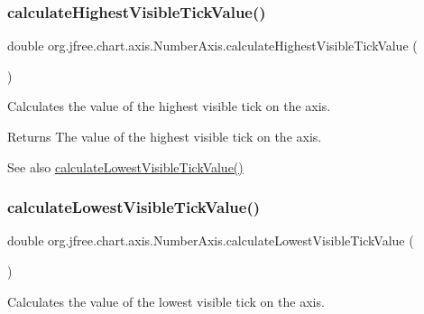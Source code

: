 \subsubsection{\texorpdfstring{calculate\+Highest\+Visible\+Tick\+Value()}{calculateHighestVisibleTickValue()}}
{\footnotesize\ttfamily double org.\+jfree.\+chart.\+axis.\+Number\+Axis.\+calculate\+Highest\+Visible\+Tick\+Value (\begin{DoxyParamCaption}{ }\end{DoxyParamCaption})\hspace{0.3cm}{\ttfamily [protected]}}

Calculates the value of the highest visible tick on the axis.

\begin{DoxyReturn}{Returns}
The value of the highest visible tick on the axis.
\end{DoxyReturn}
\begin{DoxySeeAlso}{See also}
\mbox{\hyperlink{classorg_1_1jfree_1_1chart_1_1axis_1_1_number_axis_a37ee8601a1f1f9eeb50edf7c7d49443f}{calculate\+Lowest\+Visible\+Tick\+Value()}} 
\end{DoxySeeAlso}
\mbox{\label{classorg_1_1jfree_1_1chart_1_1axis_1_1_number_axis_a37ee8601a1f1f9eeb50edf7c7d49443f}} 
\subsubsection{\texorpdfstring{calculate\+Lowest\+Visible\+Tick\+Value()}{calculateLowestVisibleTickValue()}}
{\footnotesize\ttfamily double org.\+jfree.\+chart.\+axis.\+Number\+Axis.\+calculate\+Lowest\+Visible\+Tick\+Value (\begin{DoxyParamCaption}{ }\end{DoxyParamCaption})\hspace{0.3cm}{\ttfamily [protected]}}

Calculates the value of the lowest visible tick on the axis.

